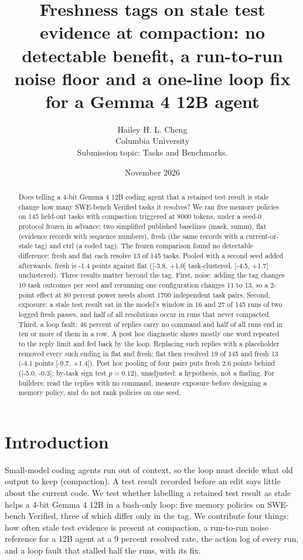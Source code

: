 \documentclass[11pt,a4paper]{article}
\title{Freshness tags on stale test evidence at compaction: no detectable benefit, a run-to-run noise floor and a one-line loop fix for a Gemma 4 12B agent}
\author{Hailey H. L. Cheng\\Columbia University\\Submission topic: Tasks and Benchmarks.}
\date{November 2026}
\begin{document}
\maketitle

\begin{abstract}
Does telling a 4-bit Gemma 4 12B coding agent that a retained test result is stale change how many SWE-bench Verified tasks it resolves? We ran five memory policies on 145 held-out tasks with compaction triggered at 8000 tokens, under a seed-0 protocol frozen in advance: two simplified published baselines (mask, summ), flat (evidence records with sequence numbers), fresh (the same records with a current-or-stale tag) and ctrl (a coded tag). The frozen comparison found no detectable difference: fresh and flat each resolve 13 of 145 tasks. Pooled with a second seed added afterwards, fresh is -1.4 points against flat ([-3.8, +1.0] task-clustered, [-4.5, +1.7] unclustered). Three results matter beyond the tag. First, noise: adding the tag changes 10 task outcomes per seed and rerunning one configuration changes 11 to 13, so a 2-point effect at 80 percent power needs about 1700 independent task pairs. Second, exposure: a stale test result sat in the model's window in 16 and 27 of 145 runs of two logged fresh passes, and half of all resolutions occur in runs that never compacted. Third, a loop fault: 46 percent of replies carry no command and half of all runs end in ten or more of them in a row. A post hoc diagnostic shows mostly one word repeated to the reply limit and fed back by the loop. Replacing such replies with a placeholder removed every such ending in flat and fresh; flat then resolved 19 of 145 and fresh 13 (-4.1 points [-9.7, +1.4]). Post hoc pooling of four pairs puts fresh 2.6 points behind ([-5.0, -0.3]; by-task sign test $p = 0.12$), unadjusted: a hypothesis, not a finding. For builders: read the replies with no command, measure exposure before designing a memory policy, and do not rank policies on one seed.
\end{abstract}

\section{Introduction}

Small-model coding agents run out of context, so the loop must decide what old output to keep (compaction). A test result recorded before an edit says little about the current code. We test whether labelling a retained test result as stale helps a 4-bit Gemma 4 12B \citep{deepmind2026} in a bash-only loop: five memory policies on SWE-bench Verified, three of which differ only in the tag. We contribute four things: how often stale test evidence is present at compaction, a run-to-run noise reference for a 12B agent at a 9 percent resolved rate, the action log of every run, and a loop fault that stalled half the runs, with its fix.
\end{document}
